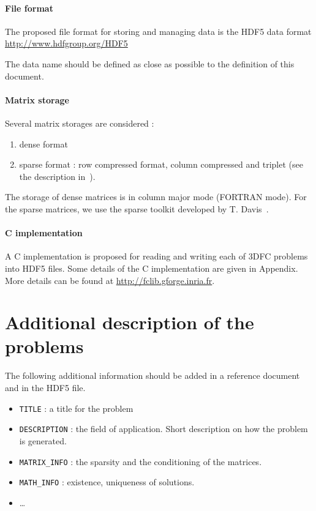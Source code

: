 \documentclass[twoside]{article}
\begin{document}
\paragraph{File format}

The proposed file format for storing and managing data is the HDF5 data format\\
 \url{http://www.hdfgroup.org/HDF5}


\noindent The data name should be defined as close as possible to the definition of this document.

\paragraph{Matrix storage}
Several matrix storages are considered :
\begin{enumerate}
\item dense format
\item sparse format : row compressed format, column compressed and triplet (see the description in~\cite{Davis:2006:DMS:1196434}).
\end{enumerate}
The storage of dense matrices is in column major mode (FORTRAN mode). For the sparse matrices, we use the sparse toolkit developed by T. Davis~\cite{Davis:2006:DMS:1196434}.

\paragraph{C implementation}

A C implementation is proposed for reading and writing each of 3DFC problems into HDF5 files. Some details of the C implementation are given in Appendix. More details can be found at \url{http://fclib.gforge.inria.fr}.




\section{Additional  description of the problems}

The following additional information should be added in a reference document and in the HDF5 file.


\begin{itemize}
\item \verb?TITLE? : a title for the problem
\item \verb?DESCRIPTION? : the field of application. Short description on how the problem is generated.
\item \verb?MATRIX_INFO? : the sparsity and the conditioning of the matrices.
\item \verb?MATH_INFO? : existence, uniqueness of solutions.
\item \ldots
\end{itemize}
\end{document}
